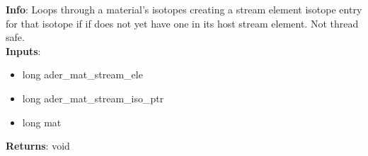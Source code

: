 \textbf{Info}: Loops through a material's isotopes creating a stream element
isotope entry for that isotope if if does not yet have one in its host
stream element. Not thread safe. \\

\noindent \textbf{Inputs}:
\begin{itemize}
\item{long ader\_mat\_stream\_ele}
\item{long ader\_mat\_stream\_iso\_ptr}
\item{long mat}
\end{itemize}

\noindent \textbf{Returns}: void
